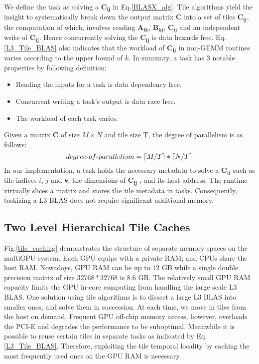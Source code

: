 \documentclass[conference]{IEEEtran}
\begin{document}
We define the task as solving a $\mathbf{C_{ij}}$ in Eq.\ref{BLASX_alg}.
Tile algorithms yield the insight to systematically break down the output matrix $\mathbf{C}$ 
into a set of tiles $\mathbf{C_{ij}}$, the computation of which, involves reading $\mathbf{A_{ik}}$, 
$\mathbf{B_{kj}}$, $\mathbf{C_{ij}}$ and an independent write of $\mathbf{C_{ij}}$. Hence 
concurrently solving the $\mathbf{C_{ij}}$ is data hazards free. Eq.\ref{L3_Tile_BLAS} 
also indicates that the workload of $\mathbf{C_{ij}}$ in non-GEMM routines varies 
according to the upper bound of $k$. In summary, a task has 3 notable properties by following definition:
\begin{itemize}
\vspace{-0.1in}
\item Reading the inputs for a task is data dependency free.
\item Concurrent writing a task's output is data race free.
\item The workload of each task varies.
\end{itemize}
\vspace{-0.1in}
Given a matrix $\mathbf{C}$ of size $M \times N$ and tile size T, the degree of parallelism is as follows:
\vspace{-0.1in}
\begin{equation} 
degree\mbox{-}of\mbox{-}parallelism = \lceil M/T \rceil * \lceil N/T \rceil
\vspace{-0.1in}
\end{equation}
In our implementation, a task holds the necessary metadata to solve a $\mathbf{C_{ij}}$ such as tile
indices $i$, $j$ and $k$, the dimensions of $\mathbf{C_{ij}}$ , and its host address. 
The runtime virtually slices a matrix and stores the tile metadata in tasks. Consequently, taskizing a L3 
BLAS does not require significant additional memory.

\vspace{-0.12in}
\subsection{Two Level Hierarchical Tile Caches}
\vspace{-0.05in}

Fig.\ref{tile_caching} demonstrates the structure of separate memory spaces on the multiGPU system.
Each GPU equips with a private RAM; and CPUs share the host RAM. Nowadays, GPU
RAM can be up to $12$ GB while a single double precision matrix of size  $32768*32768$ is $8.6$ GB. 
The relatively small GPU RAM capacity limits the GPU in-core computing from handling the large scale L3 BLAS. 
One solution using tile algorithms is to dissect a large L3 BLAS into smaller ones, 
and solve them in succession. At each time, we move in tiles from the host on demand. 
Frequent GPU off-chip memory access, however, overloads the PCI-E and degrades the 
performance to be suboptimal. Meanwhile it is possible to reuse certain tiles in separate 
tasks as indicated by Eq.\ref{L3_Tile_BLAS}. Therefore, exploiting the tile 
temporal locality by caching the most frequently used ones on the GPU RAM is necessary.
\end{document}
